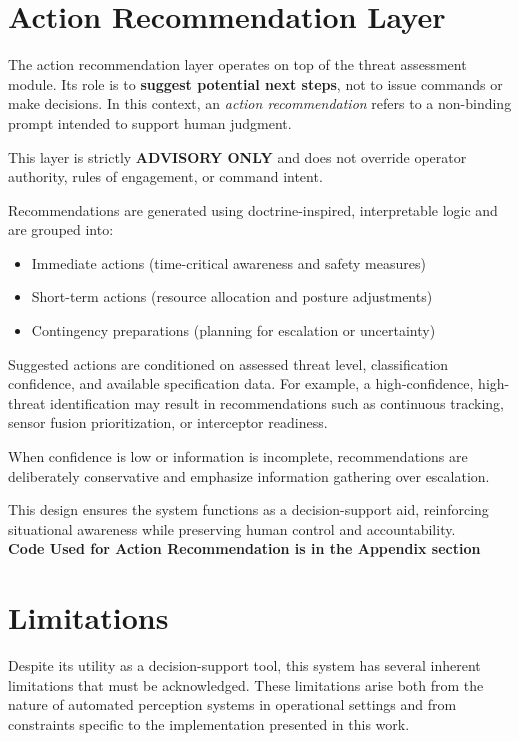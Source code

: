\documentclass[11pt]{article}
\begin{document}
\section*{Action Recommendation Layer}

The action recommendation layer operates on top of the threat assessment module. 
Its role is to \textbf{suggest potential next steps}, not to issue commands or make decisions.
In this context, an \textit{action recommendation} refers to a non-binding prompt intended to support human judgment.

This layer is strictly \textbf{ADVISORY ONLY} and does not override operator authority, rules of engagement, or command intent.

Recommendations are generated using doctrine-inspired, interpretable logic and are grouped into:
\begin{itemize}
    \item Immediate actions (time-critical awareness and safety measures)
    \item Short-term actions (resource allocation and posture adjustments)
    \item Contingency preparations (planning for escalation or uncertainty)
\end{itemize}

Suggested actions are conditioned on assessed threat level, classification confidence, and available specification data. 
For example, a high-confidence, high-threat identification may result in recommendations such as continuous tracking, sensor fusion prioritization, or interceptor readiness.

When confidence is low or information is incomplete, recommendations are deliberately conservative and emphasize information gathering over escalation.

This design ensures the system functions as a decision-support aid, reinforcing situational awareness while preserving human control and accountability.
\\
\textbf{Code Used for Action Recommendation is in the Appendix section}

\section*{Limitations}

Despite its utility as a decision-support tool, this system has several inherent limitations that must be acknowledged. These limitations arise both from the nature of automated perception systems in operational settings and from constraints specific to the implementation presented in this work.
\end{document}

